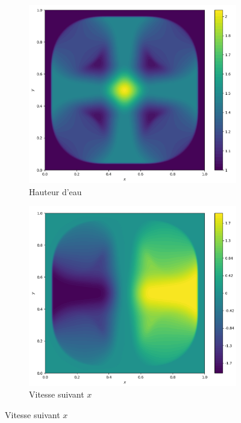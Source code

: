 \documentclass[
	french,
	11pt, %
]{fphw}
\begin{document}
\begin{figure}[H]
	\centering
	\begin{subfigure}{0.32\textwidth}
		\centering
		\includegraphics[width=\textwidth,height=0.85\textwidth]{Rusa3h.png}
		\caption{Hauteur d'eau}
		\label{fig:Rusa3h}
	\end{subfigure}
	\begin{subfigure}{0.32\textwidth}
		\centering
		\includegraphics[width=\textwidth,height=0.85\textwidth]{Rusa3u.png}
		\caption{Vitesse suivant $x$}

\end{subfigure}
\end{figure}
\end{document}

